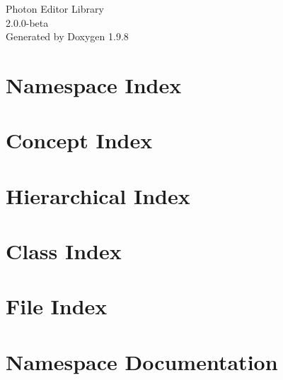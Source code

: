 \documentclass[twoside]{book}
\newcommand{\+}{\discretionary{\mbox{\scriptsize$\hookleftarrow$}}{}{}}
\newcommand{\clearemptydoublepage}{%
    \newpage{\pagestyle{empty}\cleardoublepage}%
  }
\begin{document}
  \raggedbottom
    \hypersetup{pageanchor=false,
                bookmarksnumbered=true,
                pdfencoding=unicode
               }
  \begin{titlepage}
  \vspace*{7cm}
  \begin{center}%
  {\Large Photon Editor Library}\\
  [1ex]\large 2.\+0.\+0-\/beta \\
  \vspace*{1cm}
  {\large Generated by Doxygen 1.9.8}\\
  \end{center}
  \end{titlepage}
  \clearemptydoublepage
  \tableofcontents
  \clearemptydoublepage
  \hypersetup{pageanchor=true}
\chapter{Namespace Index}

\chapter{Concept Index}

\chapter{Hierarchical Index}

\chapter{Class Index}

\chapter{File Index}

\chapter{Namespace Documentation}










\end{document}
